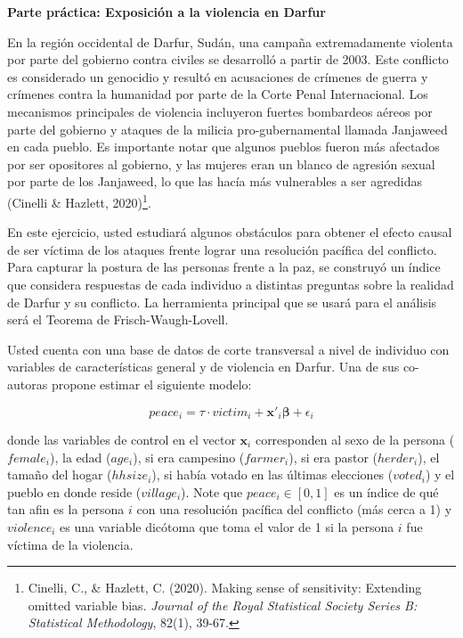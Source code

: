 \documentclass[a4paper, answers, addpoints, 11pt]{exam}
\begin{document}
   

    \bigskip


\Large\textbf{Parte práctica: Exposición a la violencia en Darfur}

\normalsize\bigskip En la región occidental de Darfur, Sudán, una campaña extremadamente violenta por parte del gobierno contra civiles se desarrolló a partir de 2003. Este conflicto es considerado un genocidio y resultó en acusaciones de crímenes de guerra y crímenes contra la humanidad por parte de la Corte Penal Internacional. Los mecanismos principales de violencia incluyeron fuertes bombardeos aéreos por parte del gobierno y ataques de la milicia pro-gubernamental llamada Janjaweed en cada pueblo. Es importante notar que algunos pueblos fueron más afectados por ser opositores al gobierno, y las mujeres eran un blanco de agresión sexual por parte de los Janjaweed, lo que las hacía más vulnerables a ser agredidas (Cinelli \& Hazlett, 2020)\footnote{Cinelli, C., \& Hazlett, C. (2020). Making sense of sensitivity: Extending omitted variable bias. \textit{Journal of the Royal Statistical Society Series B: Statistical Methodology}, 82(1), 39-67.
}.

\bigskip En este ejercicio, usted estudiará algunos obstáculos para obtener el efecto causal de ser víctima de los ataques frente lograr una resolución pacífica del conflicto. Para capturar la postura de las personas frente a la paz, se construyó un índice que considera respuestas de cada individuo a distintas preguntas sobre la realidad de Darfur y su conflicto. La herramienta principal que se usará para el análisis será el Teorema de Frisch-Waugh-Lovell.

Usted cuenta con una base de datos de corte transversal a nivel de individuo con variables de características general y de violencia en Darfur. Una de sus co-autoras propone estimar el siguiente modelo:

\begin{equation}\label{eq:no_z}
    peace_i = \tau \cdot victim_i + \textbf{x}'_i\boldsymbol\beta + \epsilon_i
\end{equation}

    donde las variables de control en el vector $\textbf{x}_i$ corresponden al sexo de la persona ($female_i$), la edad ($age_i$), si era campesino ($farmer_i$), si era pastor ($herder_i$), el tamaño del hogar ($hhsize_i$), si había votado en las últimas elecciones ($voted_i$) y el pueblo en donde reside ($village_i$). Note que $peace_i \in [0,1]$ es un índice de qué tan afin es la persona $i$ con una resolución pacífica del conflicto (más cerca a 1) y $violence_i$ es una variable dicótoma que toma el valor de 1 si la persona $i$ fue víctima de la violencia.
\end{document}
